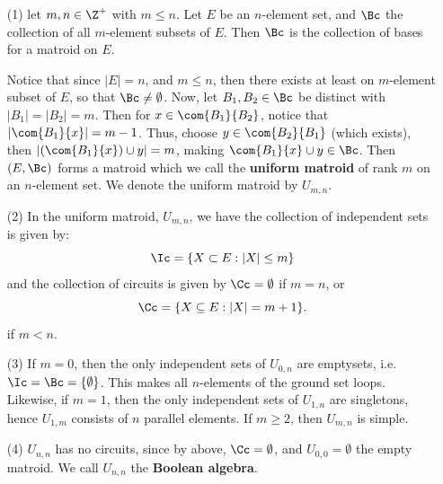 \begin{example}\label{1.9}
    \begin{enumerate}
        \item[(1)] let $m,n \in \Z^+$ with  $m \leq n$. Let  $E$ be an
            $n$-element set, and  $\Bc$ the collection of all  $m$-element
            subsets of  $E$. Then  $\Bc$ is the collection of bases for a
            matroid on  $E$.

            Notice that since  $|E|=n$, and  $m \leq n$, then there exists at
            least on  $m$-element subset of $E$, so that $\Bc \neq \emptyset$.
            Now, let $B_1,B_2 \in \Bc$ be distinct with $|B_1|=|B_2|=m$. Then
            for $x \in \com{B_1}{B_2}$, notice that $|\com{B_1}{x}|=m-1$. Thus,
            choose $y \in \com{B_2}{B_1}$ (which exists), then $|(\com{B_1}{x})
            \cup y|=m$, making $\com{B_1}{x} \cup y \in \Bc$. Then $(E,\Bc)$
            forms a matroid which we call the \textbf{uniform matroid} of rank
            $m$ on an $n$-element set. We denote the uniform matroid by
            $U_{m,n}$.

        \item[(2)] In the uniform matroid, $U_{m,n}$, we have the collection of
            independent sets is given by:
            \begin{equation*}
                \Ic=\{X \subset E : |X| \leq m\}
            \end{equation*}
            and the collection of circuits is given by $\Cc=\emptyset$ if
            $m=n$, or
            \begin{equation*}
                \Cc=\{X \subseteq E : |X|=m+1\}.
            \end{equation*}
            if $m<n$.

        \item[(3)] If $m=0$, then the only independent sets of  $U_{0,n}$ are
            emptysets, i.e. $\Ic=\Bc=\{\emptyset\}$. This makes all $n$-elements
            of the ground set loops. Likewise, if  $m=1$, then the only
            independent sets of  $U_{1,n}$ are singletons, hence $U_{1,m}$
            consists of $n$ parallel elements. If  $m \geq 2$, then $U_{m,n}$ is
            simple.

        \item[(4)] $U_{n,n}$ has no circuits, since by above, $\Cc=\emptyset$,
            and $U_{0,0}=\emptyset$ the empty matroid. We call $U_{n,n}$ the
            \textbf{Boolean algebra}.
    \end{enumerate}
\end{example}

